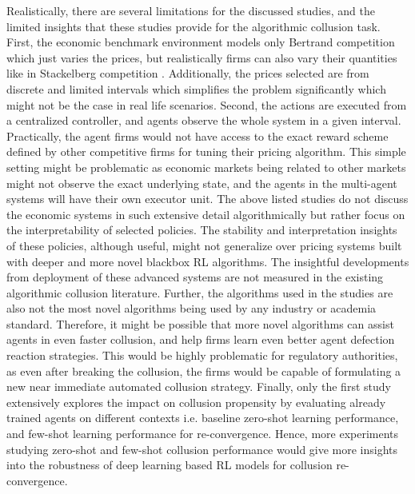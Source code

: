 \documentclass{article}
\begin{document}
Realistically, there are several limitations for the discussed studies, and the limited insights that these studies provide for the algorithmic collusion task.
First, the economic benchmark environment models only Bertrand competition which just varies the prices, but realistically firms can also vary their quantities like in Stackelberg competition \cite{julien2011note}.
Additionally, the prices selected are from discrete and limited intervals which simplifies the problem significantly which might not be the case in real life scenarios.
Second, the actions are executed from a centralized controller, and agents observe the whole system in a given interval.
Practically, the agent firms would not have access to the exact reward scheme defined by other competitive firms for tuning their pricing algorithm.
This simple setting might be problematic as economic markets being related to other markets might not observe the exact underlying state, and the agents in the multi-agent systems will have their own executor unit.
The above listed studies do not discuss the economic systems in such extensive detail algorithmically but rather focus on the interpretability of selected policies.
The stability and interpretation insights of these policies, although useful, might not generalize over pricing systems built with deeper and more novel blackbox RL algorithms.
The insightful developments from deployment of these advanced systems are not measured in the existing algorithmic collusion literature.
Further, the algorithms used in the studies are also not the most novel algorithms being used by any industry or academia standard.
Therefore, it might be possible that more novel algorithms can assist agents in even faster
collusion, and help firms learn even better agent defection reaction strategies.
This would be highly problematic for regulatory authorities, as even after breaking the collusion, the firms would be capable of formulating a new near immediate automated collusion strategy.
Finally, only the first study extensively explores the impact on collusion propensity by evaluating already trained agents on different contexts i.e. baseline zero-shot learning performance, and few-shot learning performance for re-convergence.
Hence, more experiments studying zero-shot and few-shot collusion performance would give more insights into the robustness of deep learning based RL models for collusion re-convergence.
\end{document}

